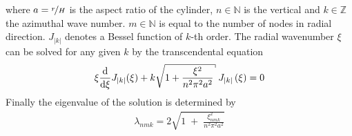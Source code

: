 where $a=\nicefrac{r}{H}$ is the aspect ratio of the cylinder,
$n\in\mathbb{N}$ is the vertical and $k\in\mathbb{Z}$ the azimuthal wave number.
$m\in\mathbb{N}$ is equal to the number of nodes in radial direction.
$J_{|k|}$ denotes a Bessel function of $k$-th order.
The radial wavenumber $\xi$  can be solved for any given $k$ by the transcendental equation
\begin{align}
    \xi \frac{\dif}{\dif \xi}J_{|k|}(\xi) + k \sqrt{1 + \frac{\xi^2}{n^2\pi^2a^2}} \; J_{|k|}\left(\xi\right) = 0
\end{align}
Finally the eigenvalue of the solution is determined by
\begin{align}
    \lambda_{nmk} = 2\sqrt{1 \; + \;\frac{ \xi_{nmk}^2}{n^2\pi^2a^2}}
\end{align}

%
%
%




